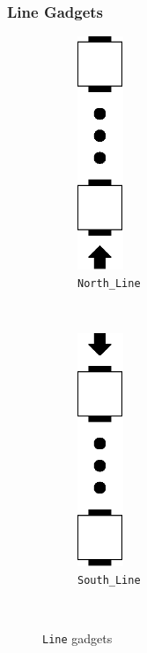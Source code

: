 \subsubsection{Line Gadgets}
\begin{figure}[H]
    \centering
    \begin{subfigure}[t]{0.15\textwidth}
        \centering
        \includegraphics[width=0.15\textwidth]{north_line}
        \caption{\label{fig:north_line} {\tt North\_Line}}
    \end{subfigure}%
    ~
    \begin{subfigure}[t]{0.15\textwidth}
        \centering
        \includegraphics[width=0.15\textwidth]{south_line}
        \caption{\label{fig:south_line} {\tt South\_Line} }
    \end{subfigure}%
    ~
    \caption{\label{fig:line_gadgets} {\tt Line} gadgets}
\end{figure}

